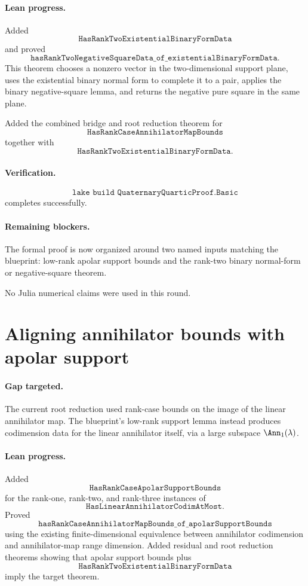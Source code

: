 \documentclass[11pt]{article}
\begin{document}
\paragraph{Lean progress.}
Added
\[
\texttt{HasRankTwoExistentialBinaryFormData}
\]
and proved
\[
\texttt{hasRankTwoNegativeSquareData\_of\_existentialBinaryFormData}.
\]
This theorem chooses a nonzero vector in the two-dimensional support plane,
uses the existential binary normal form to complete it to a pair, applies the
binary negative-square lemma, and returns the negative pure square in the same
plane.

Added the combined bridge and root reduction theorem for
\[
\texttt{HasRankCaseAnnihilatorMapBounds}
\]
together with
\[
\texttt{HasRankTwoExistentialBinaryFormData}.
\]

\paragraph{Verification.}
\[
\texttt{lake build QuaternaryQuarticProof.Basic}
\]
completes successfully.

\paragraph{Remaining blockers.}
The formal proof is now organized around two named inputs matching the
blueprint: low-rank apolar support bounds and the rank-two binary normal-form
or negative-square theorem.

No Julia numerical claims were used in this round.

\section*{Aligning annihilator bounds with apolar support}

\paragraph{Gap targeted.}
The current root reduction used rank-case bounds on the image of the linear
annihilator map.  The blueprint's low-rank support lemma instead produces
codimension data for the linear annihilator itself, via a large subspace
\(\Ann_1(\lambda)\).

\paragraph{Lean progress.}
Added
\[
\texttt{HasRankCaseApolarSupportBounds}
\]
for the rank-one, rank-two, and rank-three instances of
\[
\texttt{HasLinearAnnihilatorCodimAtMost}.
\]
Proved
\[
\texttt{hasRankCaseAnnihilatorMapBounds\_of\_apolarSupportBounds}
\]
using the existing finite-dimensional equivalence between annihilator
codimension and annihilator-map range dimension.  Added residual and root
reduction theorems showing that apolar support bounds plus
\[
\texttt{HasRankTwoExistentialBinaryFormData}
\]
imply the target theorem.
\end{document}
